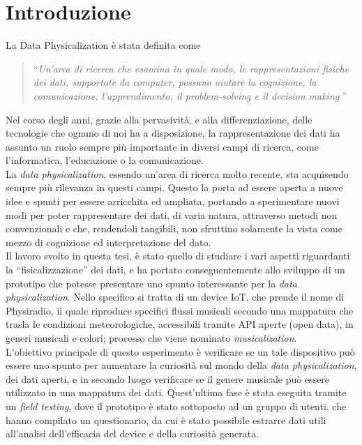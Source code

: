 \documentclass[12pt,a4paper]{report}
\newcommand{\physiradio}{Physiradio} %
\begin{document}

\chapter{Introduzione}

La Data Physicalization è stata definita come 
\begin{quote}
``\emph{Un'area di ricerca che esamina in quale modo, le rappresentazioni fisiche dei dati, supportate da computer, possano aiutare la cognizione, la comunicazione, l'apprendimento, il \textit{problem-solving} e \textit{il decision making} }'' \cite{jansen2015opportunities}
\end{quote} %

Nel corso degli anni, grazie alla pervasività, e alla differenziazione, delle tecnologie che ognuno di noi ha a disposizione, la rappresentazione dei dati ha assunto un ruolo sempre più importante in diversi campi di ricerca, come l'informatica, l'educazione o la comunicazione.\\ 
La \textit{data physicalization}, essendo un'area di ricerca molto recente, sta acquisendo sempre più rilevanza in questi campi. Questo la porta ad essere aperta a nuove idee e spunti per essere arricchita ed ampliata, portando a sperimentare nuovi modi per poter rappresentare dei dati, di varia natura, attraverso metodi non convenzionali e che, rendendoli tangibili, non sfruttino solamente la vista come mezzo di cognizione ed interpretazione del dato.\\


Il lavoro svolto in questa tesi, è stato quello di studiare i vari aspetti riguardanti la ``fisicalizzazione'' dei dati, e ha portato conseguentemente allo sviluppo di un prototipo che potesse presentare uno spunto interessante per la \textit{data physicalization}.
Nello specifico si tratta di un device IoT, che prende il nome di \physiradio, il quale riproduce specifici flussi musicali secondo una mappatura che trasla le condizioni meteorologiche, accessibili tramite API aperte (open data), in generi musicali e colori; processo che viene nominato \textit{musicalization}.\\
L'obiettivo principale di questo esperimento è verificare se un tale dispositivo può essere uno spunto per aumentare la curiosità sul mondo della \textit{data physicalization}, dei dati aperti, e in secondo luogo verificare se il genere musicale può essere utilizzato in una mappatura dei dati. Quest'ultima fase è stata eseguita tramite un \textit{field testing}, dove il prototipo è stato sottoposto ad un gruppo di utenti, che hanno compilato un questionario, da cui è stato possibile estrarre dati utili all'analisi dell'efficacia del device e della curiosità generata.
\end{document}
